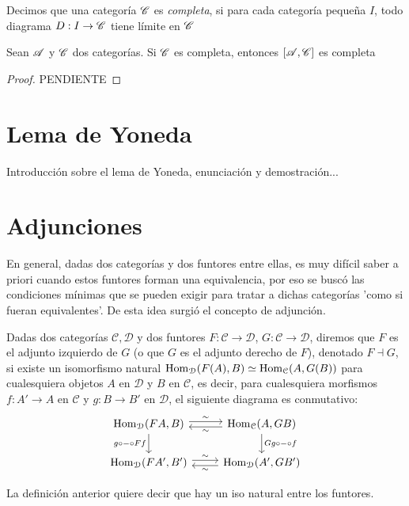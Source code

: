 \documentclass{comunicaciones}
\begin{document}
\begin{dfn}
    Decimos que una categoría $\mathscr C$ es \emph{completa}, si para cada categoría pequeña $I$, todo diagrama $D:I\to\mathscr C$ tiene límite en $\mathscr C$
\end{dfn}


\begin{thm}
    Sean $\mathscr A$ y $\mathscr C$ dos categorías. Si $\mathscr C$ es completa, entonces $[\mathscr A,\mathscr C]$ es completa
\end{thm}
\begin{proof}
    PENDIENTE
\end{proof}

\section{Lema de Yoneda}

Introducción sobre el lema de Yoneda, enunciación y demostración...

\section{Adjunciones}

En general, dadas dos categorías y dos funtores entre ellas, es muy difícil saber a priori cuando estos funtores forman una equivalencia, por eso se buscó las condiciones mínimas que se pueden exigir para tratar a dichas categorías 'como si fueran equivalentes'. De esta idea surgió el concepto de adjunción.
\begin{dfn}
	Dadas dos categorías $\mathcal{C,D}$ y dos funtores $F:\mathcal{C\to D}$, $G:\mathcal{C\to D}$, diremos que $F$ es el adjunto izquierdo de $G$ (o que $G$ es el adjunto derecho de $F$), denotado $F\dashv G$, si existe un isomorfismo natural $\mathrm{Hom}_\mathcal{D}(F(A),B)\simeq \mathrm{Hom}_\mathcal{C}(A,G(B))$ para cualesquiera objetos $A$ en $\mathcal{D}$ y $B$ en $\mathcal{C}$, es decir, para cualesquiera morfismos $f:A'\to A$
	en $\mathcal C$ y $g:B\to B'$ en $\mathcal D$,
	el siguiente diagrama es conmutativo:
	\[
	\begin{tikzcd}
		\Hom_\mathcal{D}(FA,B)
		\ar[d,"g\circ-\circ Ff"']
		\ar[r,"\sim",shift left]
		& \Hom_\mathcal{C}(A,GB) 
		\ar[d,"Gg\circ-\circ f"]
		\ar[l,"\sim",shift left] \\
		\Hom_\mathcal{D}(FA',B')
		\ar[r,"\sim",shift left]
		& \Hom_\mathcal{D}(A',GB')
		\ar[l,"\sim",shift left]
	\end{tikzcd}
	\]
\end{dfn}
La definición anterior quiere decir que hay un iso natural entre los funtores.
\end{document}
